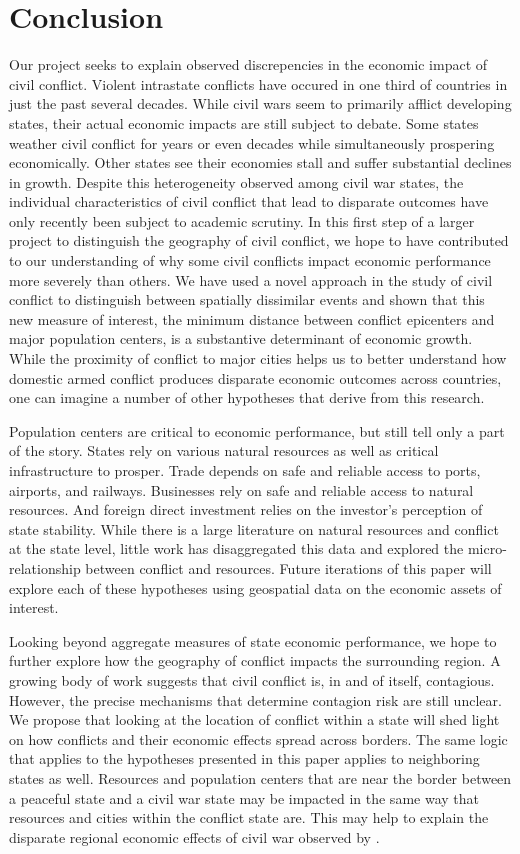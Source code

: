 \section{Conclusion}
\label{conclusion}

Our project seeks to explain observed discrepencies in the economic impact of civil conflict. Violent intrastate conflicts have occured in one third of countries in just the past several decades. While civil wars seem to primarily afflict developing states, their actual economic impacts are still subject to debate. Some states weather civil conflict for years or even decades while simultaneously prospering economically. Other states see their economies stall and suffer substantial declines in growth. Despite this heterogeneity observed among civil war states, the individual characteristics of civil conflict that lead to disparate outcomes have only recently been subject to academic scrutiny. In this first step of a larger project to distinguish the geography of civil conflict, we hope to have contributed to our understanding of why some civil conflicts impact economic performance more severely than others. We have used a novel approach in the study of civil conflict to distinguish between spatially dissimilar events and shown that this new measure of interest, the minimum distance between conflict epicenters and major population centers, is a substantive determinant of economic growth. While the proximity of conflict to major cities helps us to better understand how domestic armed conflict produces disparate economic outcomes across countries, one can imagine a number of other hypotheses that derive from this research.

Population centers are critical to economic performance, but still tell only a part of the story. States rely on various natural resources as well as critical infrastructure to prosper. Trade depends on safe and reliable access to ports, airports, and railways. Businesses rely on safe and reliable access to natural resources. And foreign direct investment relies on the investor's perception of state stability. While there is a large literature on natural resources and conflict at the state level, little work has disaggregated this data and explored the micro-relationship between conflict and resources. Future iterations of this paper will explore each of these hypotheses using geospatial data on the economic assets of interest.

Looking beyond aggregate measures of state economic performance, we hope to further explore how the geography of conflict impacts the surrounding region. A growing body of work suggests that civil conflict is, in and of itself, contagious. However, the precise mechanisms that determine contagion risk are still unclear. We propose that looking at the location of conflict within a state will shed light on how conflicts and their economic effects spread across borders. The same logic that applies to the hypotheses presented in this paper applies to neighboring states as well. Resources and population centers that are near the border between a peaceful state and a civil war state may be impacted in the same way that resources and cities within the conflict state are. This may help to explain the disparate regional economic effects of civil war observed by \cite{murdoch:sandler:2002b}.